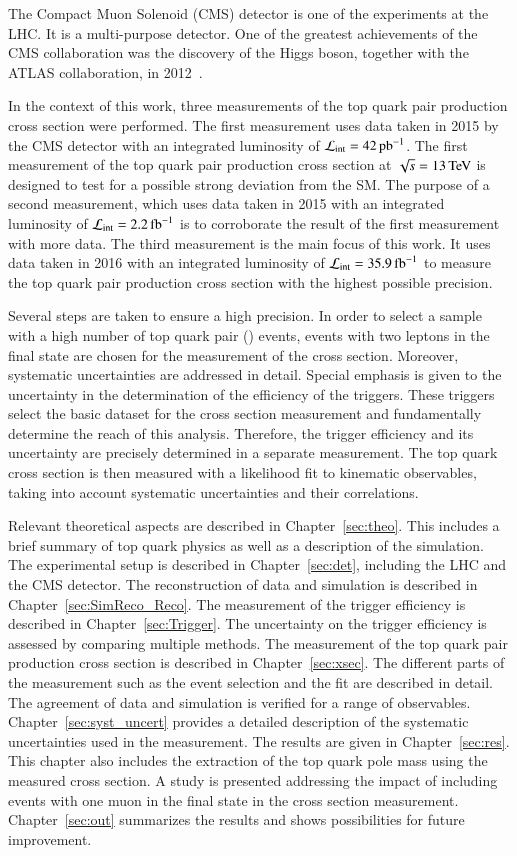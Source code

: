 The Compact Muon Solenoid (CMS) detector is one of the experiments at the LHC. It is a multi-purpose detector.
One of the greatest achievements of the CMS collaboration was the discovery of the Higgs boson, together with the ATLAS collaboration, in 2012~\cite{201230,20121}.   

In the context of this work, three measurements of the top quark pair production cross section were performed.
The first measurement uses data taken in 2015 by the CMS detector with an integrated luminosity of $\mathcal{L}_\mathrm{int}= 42 \mbox{\ensuremath{\,\text{pb}^\text{$-$1}}}$. The first measurement of the top quark pair production
cross section at $\sqrt{s}=13 \,\text{Te\hspace{-.08em}V}$ is designed to test for a possible strong deviation from the SM. The purpose of a second measurement, which uses data taken in 2015 with an integrated luminosity of $\mathcal{L}_\mathrm{int}= 2.2 \mbox{\ensuremath{\,\text{fb}^\text{$-$1}}}$ is to corroborate the result of the first measurement with more data.
The third measurement is the main focus of this work. It uses data taken in 2016 with an integrated luminosity of $\mathcal{L}_\mathrm{int}= 35.9 \mbox{\ensuremath{\,\text{fb}^\text{$-$1}}}$ to measure the top quark pair production cross section with the highest possible precision.

Several steps are taken to ensure a high precision. In order to select a sample with a high number of top quark pair (\ttbar) events, events with two leptons in the final state are chosen for the measurement of the cross section.
Moreover, systematic uncertainties are addressed in detail.
Special emphasis is given to the uncertainty in the determination of the efficiency of the triggers. These triggers select the basic dataset for the cross section measurement and fundamentally determine the reach of this analysis. Therefore, the trigger efficiency and its uncertainty are precisely determined in a separate measurement.
The top quark cross section is then measured with a likelihood fit to kinematic observables, taking into account systematic uncertainties and their correlations. 

Relevant theoretical aspects are described in Chapter~\ref{sec:theo}. This includes a brief summary of top quark physics as well as a description of the simulation.
The experimental setup is described in Chapter~\ref{sec:det}, including the LHC and the CMS detector. The reconstruction of data and simulation is described in Chapter~\ref{sec:SimReco_Reco}. 
The measurement of the trigger efficiency is described in Chapter~\ref{sec:Trigger}. The uncertainty on the trigger efficiency is assessed by comparing multiple methods.
The measurement of the top quark pair production cross section is described in Chapter~\ref{sec:xsec}. The different parts of the measurement such as the event selection and the fit are described in detail.
The agreement of data and simulation is verified for a range of observables. Chapter~\ref{sec:syst_uncert} provides a detailed description of the systematic uncertainties used in the measurement.
The results are given in Chapter~\ref{sec:res}. This chapter also includes the extraction of the top quark pole mass using the measured \ttbar cross section. A study is presented addressing the impact of 
including events with one muon in the final state in the \ttbar cross section measurement. Chapter~\ref{sec:out} summarizes the results and shows
possibilities for future improvement.



